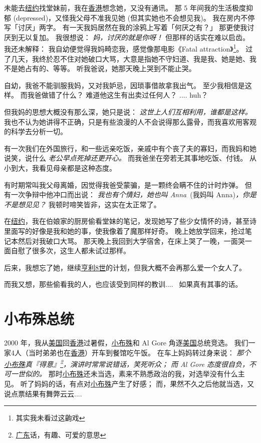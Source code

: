 \documentclass[12pt]{report}
\newcommand{\speechCn}[1]{\textrm{\textit{\textcolor{Speech}{#1}}}}
\begin{document}
未能去\uline{纽约}找堂妹前，我在\uline{香港}想念她，又没有通讯。 那 5 年间我的生活极度抑郁 (depressed)，又怪我父母不准我见她 (但其实她也不会想见我)。 我在房内不停写「讨厌」两字。 有一天我妈居然在我的涂鸦上写着「何厌之有？」 那更使我讨厌到无以复加。 我很想说： \speechCn{妈，讨厌的就是你呀！}  但那样的话实在难以启齿。 我还未解释： 我自幼便觉得我妈畸恋我，感觉像那电影《Fatal attraction》\footnote{其实我未看过这齣戏}。 过了几天，我终於忍不住对她破口大骂，大意是指她不守妇道、我是我、她是她、我不是她占有的、等等。 听我爸说，她那天晚上哭到不能止哭。

自幼，我爸不能驯服我妈，又对我妒忌，因琐事借故拿我出气。 至少我相信是这样。 而我爸做错了什么？ 难道他这生有出卖过任何人？ .... huh？

但我妈的思想大概没有那么深，她只是说： \speechCn{这世上人们互相利用，谁都是这样。}  我也不认为她讲得不正确，只是有些浪漫的人不会说得那么露骨，而我喜欢用客观的科学去分析一切。

有一次我们在外国旅行，和一些远亲吃饭，亲戚中有个丧了夫的寡妇，而我妈和她说笑，说什么 \speechCn{老公早点死掉还更开心。}  而我爸坐在旁若无其事地吃饭、付钱。 从小到大，我看见母亲都是这种态度。

有时期常叫我父母离婚，因觉得我爸受蒙骗，是一颗终会瞒不住的计时炸弹。 但有一次争辩中他冲口而出说： \speechCn{我也有个情妇，她也叫 Anna}\ (我妈叫 Anna)\speechCn{，你是不是想见见？}  我顿时啼笑皆非，这实在太正常了。

在\uline{纽约}，我在伯娘家的厨房偷看堂妹的笔记，发现她写了些少女情怀的诗，甚至诗里面写的好像是我和她的事，使我像着了魔那样好奇。 晚上她放学回来，抢过笔记本然后对我破口大骂。 那天晚上我回到大学宿舍，在床上哭了一晚，一面哭一面自慰了很多次，这生人都未试过那样。

后来，我想忘了她，继续\uline{亨利8世}的计划，但我大概不会再那么爱一个女人了。

而我又想，那些偷看我的人，也应该受到同样的教训....~ 如果真有其事的话。

\chapter{小布殊总统}

2000 年，我从\uline{美国}回\uline{香港}过暑假，\uline{小布殊}和 Al Gore 角逐\uline{美国}总统竞选。  我们一家4人（当时弟弟也在\uline{香港}）开车到餐馆吃午饭。  在车上妈妈转过身来说： \speechCn{那个\uline{小布殊}真『得意』\footnote{\uline{广东}话，有趣、可爱的意思}，演讲时常常说错话，笑死听众； 而 Al Gore 态度很自负，不可一世似的。}  那时\uline{小布殊}还未当选，素来不熟悉政治的我，对选举没有什么主见。 听了妈妈的话，有点对\uline{小布殊}产生了好感； 而，果然不久之后他就当选，又说点票结果有舞弊云云....
\end{document}
